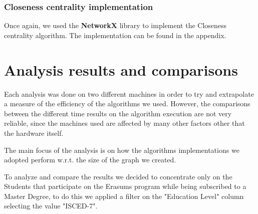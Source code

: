     \subsubsection*{Closeness centrality implementation}
    Once again, we used the \textbf{NetworkX} library to implement the Closeness centrality algorithm.
    The implementation can be found in the appendix.

    \section{Analysis results and comparisons}
    Each analysis was done on two different machines in order to try and extrapolate a measure of the efficiency of the algorithms we used. 
    However, the comparisons between the different time results on the algorithm execution are not very reliable, since the machines used
    are affected by many other factors other that the hardware itself. 

    The main focus of the analysis is on how the algorithms implementations we adopted perform w.r.t. the size of the graph we created.

    To analyze and compare the results we decided to concentrate only on the Students that participate on the Erasums program while being
    subscribed to a Master Degree, to do this we applied a filter on the "Education Level" column selecting the value "ISCED-7".

